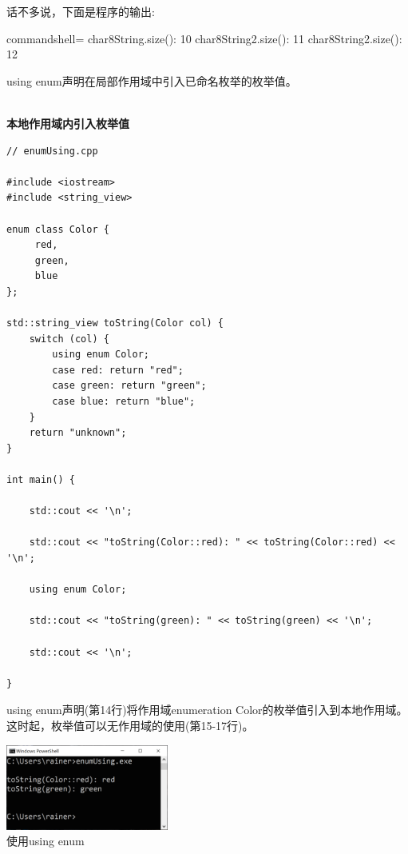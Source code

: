 话不多说，下面是程序的输出:

\begin{tcblisting}{commandshell={}}
char8String.size(): 10
char8String2.size(): 11
char8String2.size(): 12
\end{tcblisting}


using enum声明在局部作用域中引入已命名枚举的枚举值。

\hspace*{\fill} \\ %
\noindent
\textbf{本地作用域内引入枚举值}
\begin{lstlisting}[style=styleCXX]
// enumUsing.cpp

#include <iostream>
#include <string_view>

enum class Color {
	 red,
	 green,
	 blue
};

std::string_view toString(Color col) {
	switch (col) {
		using enum Color;
		case red: return "red";
		case green: return "green";
		case blue: return "blue";
	}
	return "unknown";
}

int main() {

	std::cout << '\n';
	
	std::cout << "toString(Color::red): " << toString(Color::red) << '\n';
	
	using enum Color;
	
	std::cout << "toString(green): " << toString(green) << '\n';
	
	std::cout << '\n';

}
\end{lstlisting}

using enum声明(第14行)将作用域enumeration Color的枚举值引入到本地作用域。这时起，枚举值可以无作用域的使用(第15-17行)。

\begin{center}
\includegraphics[width=0.4\textwidth]{content/3/chapter4/images/48.png}\\
使用using enum
\end{center}


